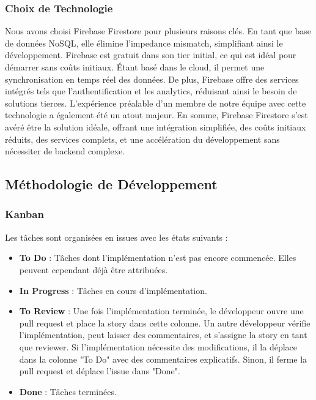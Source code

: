 \subsubsection{Choix de Technologie}
Nous avons choisi Firebase Firestore pour plusieurs raisons clés. En tant que base de données NoSQL, elle élimine l'impedance mismatch, simplifiant ainsi le développement. Firebase est gratuit dans son tier initial, ce qui est idéal pour démarrer sans coûts initiaux. Étant basé dans le cloud, il permet une synchronisation en temps réel des données. De plus, Firebase offre des services intégrés tels que l'authentification et les analytics, réduisant ainsi le besoin de solutions tierces. L'expérience préalable d'un membre de notre équipe avec cette technologie a également été un atout majeur. En somme, Firebase Firestore s'est avéré être la solution idéale, offrant une intégration simplifiée, des coûts initiaux réduits, des services complets, et une accélération du développement sans nécessiter de backend complexe.


\subsection{Méthodologie de Développement}

\subsubsection{Kanban}

Les tâches sont organisées en issues avec les états suivants :

\begin{itemize}[noitemsep]
    \item \textbf{To Do} : Tâches dont l'implémentation n'est pas encore commencée. Elles peuvent cependant déjà être attribuées.
    \item \textbf{In Progress} : Tâches en cours d'implémentation.
    \item \textbf{To Review} : Une fois l'implémentation terminée, le développeur ouvre une pull request et place la story dans cette colonne. Un autre développeur vérifie l'implémentation, peut laisser des commentaires, et s'assigne la story en tant que reviewer. Si l'implémentation nécessite des modifications, il la déplace dans la colonne "To Do" avec des commentaires explicatifs. Sinon, il ferme la pull request et déplace l'issue dans "Done".
    \item \textbf{Done} : Tâches terminées.
\end{itemize}

